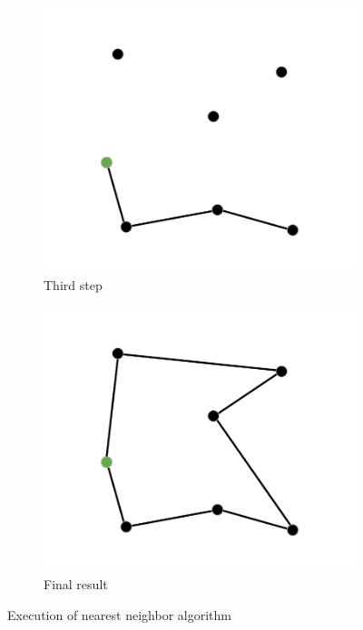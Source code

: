 \begin{figure}[h!]
  \begin{subfigure}[b]{0.48\linewidth}
    \includegraphics[width=\linewidth]{media/fase3.pdf}
    \caption{Third step}
  \end{subfigure}
  \begin{subfigure}[b]{0.48\linewidth}
    \includegraphics[width=\linewidth]{media/fase4.pdf}
    \caption{Final result}
  \end{subfigure}
  \caption{Execution of nearest neighbor algorithm}
\end{figure}

